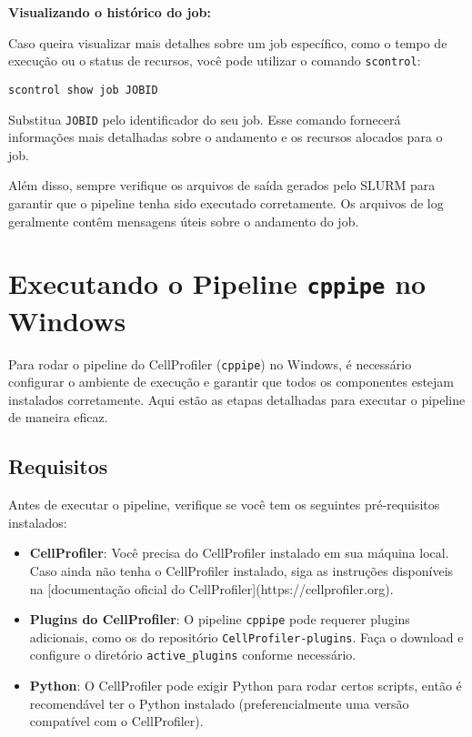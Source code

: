 \documentclass[a4paper, 12pt]{article}
\begin{document}
\textbf{Visualizando o histórico do job:}

Caso queira visualizar mais detalhes sobre um job específico, como o tempo de execução ou o status de recursos, você pode utilizar o comando \texttt{scontrol}:

\begin{verbatim}
scontrol show job JOBID
\end{verbatim}

Substitua \texttt{JOBID} pelo identificador do seu job. Esse comando fornecerá informações mais detalhadas sobre o andamento e os recursos alocados para o job.

Além disso, sempre verifique os arquivos de saída gerados pelo SLURM para garantir que o pipeline tenha sido executado corretamente. Os arquivos de log geralmente contêm mensagens úteis sobre o andamento do job.

\section{Executando o Pipeline \texttt{cppipe} no Windows}

Para rodar o pipeline do CellProfiler (\texttt{cppipe}) no Windows, é necessário configurar o ambiente de execução e garantir que todos os componentes estejam instalados corretamente. Aqui estão as etapas detalhadas para executar o pipeline de maneira eficaz.

\subsection{Requisitos}

Antes de executar o pipeline, verifique se você tem os seguintes pré-requisitos instalados:

\begin{itemize}
  \item \textbf{CellProfiler}: Você precisa do CellProfiler instalado em sua máquina local. Caso ainda não tenha o CellProfiler instalado, siga as instruções disponíveis na [documentação oficial do CellProfiler](https://cellprofiler.org).
  \item \textbf{Plugins do CellProfiler}: O pipeline \texttt{cppipe} pode requerer plugins adicionais, como os do repositório \texttt{CellProfiler-plugins}. Faça o download e configure o diretório \texttt{active\_plugins} conforme necessário.
  \item \textbf{Python}: O CellProfiler pode exigir Python para rodar certos scripts, então é recomendável ter o Python instalado (preferencialmente uma versão compatível com o CellProfiler).
\end{itemize}
\end{document}
